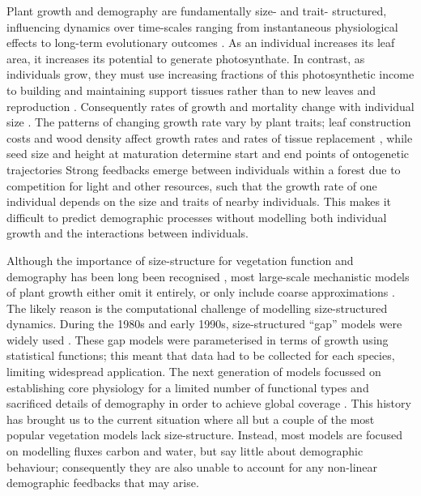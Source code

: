 \documentclass[a4paper,11pt]{article}
\begin{document}
Plant growth and demography are fundamentally size- and trait-
structured, influencing dynamics over time-scales ranging from
instantaneous physiological effects to long-term evolutionary outcomes
\citep{Harper-1977, Westoby-2002}. As an individual increases its leaf
area, it increases its potential to generate photosynthate.  In
contrast, as individuals grow, they must use increasing fractions of
this photosynthetic income to building and maintaining support tissues
rather than to new leaves \citep{Givnish-1988, Enquist-2007} and
reproduction \citep{Thomas-2011}. Consequently rates of growth and
mortality change with individual size \citep{Muller-2006, Ruger-2011, Thomas-2011}.
%
The patterns of changing growth rate vary by plant traits; leaf
construction costs and wood density affect growth rates and rates of
tissue replacement \citep{Wright-2010}, while seed size and height at
maturation determine start and end points of ontogenetic trajectories
\citep{Westoby-2002}
%
Strong feedbacks emerge between individuals within a forest due to
competition for light and other resources, such that the growth rate
of one individual depends on the size and traits of nearby
individuals.  This makes it difficult to predict demographic processes
without modelling both individual growth and the interactions between
individuals.

Although the importance of size-structure for vegetation function and
demography has been long been recognised
\citep[e.g.,][]{Harper-1977, Shugart-1980, Huston-1987},
most large-scale mechanistic models of plant growth either omit it
entirely, or only include coarse approximations
\citep{Cramer-2001, Sitch-2003, Kelley-2013,Dekauwe-2014}. The likely
reason is the computational
challenge of modelling size-structured dynamics. 
During the 1980s and
early 1990s, size-structured ``gap'' models were widely used
\citep[e.g.][]{Shugart-1980,Huston-1987}. These gap models were
parameterised in terms of growth using statistical functions; this meant 
that data had to be collected for each species, limiting widespread application. 
The next generation of models focussed on establishing core physiology for 
a limited number of functional types and
sacrificed details of demography in order to achieve global coverage
\citep{Woodward-1995,Haxeltine-1996}. This history has brought us to the
current situation where all but a couple
\citep[e.g.][]{Moorcroft-2001, Smith-2014} of the most popular vegetation
models lack size-structure. Instead, most models
are focused on modelling fluxes carbon and water, but say little about
demographic behaviour; consequently they are also unable to account for
any non-linear demographic feedbacks that may arise.
\end{document}
